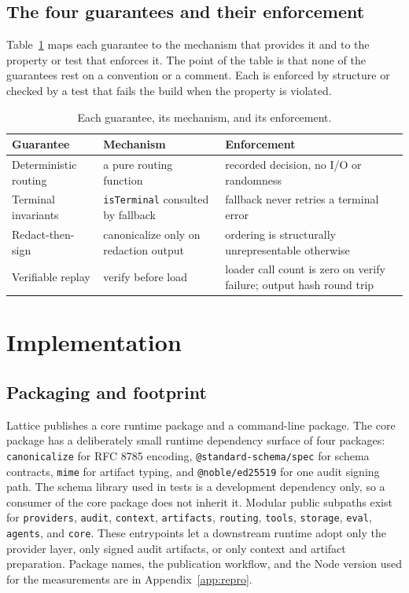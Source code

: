 \documentclass[conference]{IEEEtran}
\newcommand{\code}[1]{\texttt{\small #1}}
\begin{document}
\subsection{The four guarantees and their enforcement}

Table~\ref{tab:guarantees} maps each guarantee to the mechanism that provides it and
to the property or test that enforces it. The point of the table is that none of the
guarantees rest on a convention or a comment. Each is enforced by structure or checked
by a test that fails the build when the property is violated.

\begin{table}[t]
\centering
\caption{Each guarantee, its mechanism, and its enforcement.}
\label{tab:guarantees}
\footnotesize
\begin{tabular}{@{}p{} p{} p{}@{}}
\toprule
Guarantee & Mechanism & Enforcement \\
\midrule
Deterministic routing & a pure routing function & recorded decision, no I/O or randomness \\
Terminal invariants & \code{isTerminal} consulted by fallback & fallback never retries a terminal error \\
Redact-then-sign & canonicalize only on redaction output & ordering is structurally unrepresentable otherwise \\
Verifiable replay & verify before load & loader call count is zero on verify failure; output hash round trip \\
\bottomrule
\end{tabular}
\end{table}

\section{Implementation}

\subsection{Packaging and footprint}

Lattice publishes a core runtime package and a command-line package.
The core package has a deliberately small runtime dependency surface of four
packages: \code{canonicalize} for RFC 8785 encoding, \code{@standard-schema/spec} for
schema contracts, \code{mime} for artifact typing, and \code{@noble/ed25519} for one
audit signing path. The schema library used in tests is a development
dependency only, so a consumer of the core package does not inherit it.
Modular public subpaths exist for \code{providers}, \code{audit},
\code{context}, \code{artifacts}, \code{routing}, \code{tools}, \code{storage},
\code{eval}, \code{agents}, and \code{core}. These entrypoints let a downstream
runtime adopt only the provider layer, only signed audit artifacts, or only context
and artifact preparation. Package names, the publication workflow, and the Node
version used for the measurements are in Appendix~\ref{app:repro}.
\end{document}
